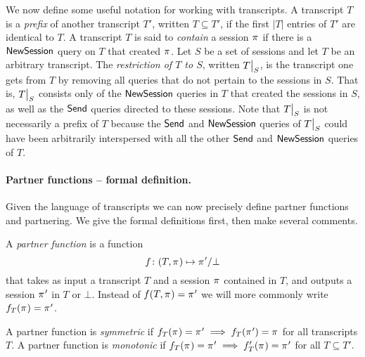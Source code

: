 We now define some useful notation for working with transcripts.
A transcript $T$ is a \emph{prefix} of another transcript $T'$,
written $T \subseteq T'$,
if the first $|T|$ entries of $T'$ are identical to $T$.  
A transcript $T$ is said to \emph{contain} a  session $\oracle$ if there is a $\mathsf{NewSession}$ query on $T$ that created $\oracle$.
Let $S$ be a set of sessions and let $T$ be an arbitrary transcript.
The \emph{restriction of $T$ to $S$},
written $\restrict{T}{S}$,
is the transcript one gets from $T$ by removing all queries that do not pertain to the sessions in $S$.
That is, $\restrict{T}{S}$ consists only of the $\mathsf{NewSession}$ queries in $T$ that created the sessions in $S$,
as well as the $\mathsf{Send}$ queries directed to these sessions.
Note that $\restrict{T}{S}$ is not necessarily a prefix of $T$
because the $\mathsf{Send}$ and $\mathsf{NewSession}$ queries of $\restrict{T}{S}$ could have been arbitrarily interspersed with all the other $\mathsf{Send}$ and $\mathsf{NewSession}$ queries of $T$.

\paragraph{Partner functions -- formal definition.}
Given the language of transcripts we can now precisely define partner functions and partnering.
We give the formal definitions first,
then make several comments.


\begin{definition}\label{def:partner_functions}
A \emph{partner function} is a function 
\begin{equation}
f \colon (T,\oracle) \mapsto  \oracle' / \bot 
\end{equation}
that takes as input a transcript $T$
and a session $\oracle$ contained in $T$,
and outputs a  session $\oracle'$ in $T$ or $\bot$.
Instead of $f(T, \oracle) = \oracle'$ we will more commonly write $f_T(\oracle) = \oracle'$.

A partner function is \emph{symmetric} if $f_T(\oracle) = \oracle' \implies f_T(\oracle') = \oracle$ for all transcripts $T$.  
A partner function is \emph{monotonic} if $f_T(\oracle) = \oracle' \implies f_T'(\oracle) = \oracle'$ for all $T \subseteq T'$.
\end{definition}

